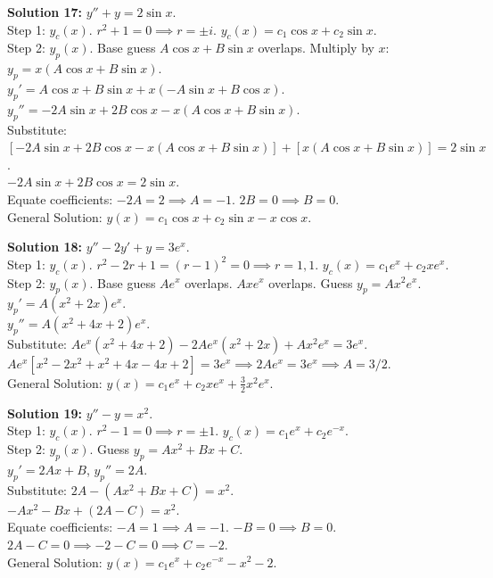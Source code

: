 \documentclass[11pt]{article}
\begin{document}
\textbf{Solution 17:} $y'' + y = 2 \sin x$. \\
Step 1: $y_c(x)$. $r^2 + 1 = 0 \implies r = \pm i$. $y_c(x) = c_1 \cos x + c_2 \sin x$. \\
Step 2: $y_p(x)$. Base guess $A \cos x + B \sin x$ overlaps. Multiply by $x$: $y_p = x(A \cos x + B \sin x)$. \\
$y_p' = A \cos x + B \sin x + x(-A \sin x + B \cos x)$. \\
$y_p'' = -2A \sin x + 2B \cos x - x(A \cos x + B \sin x)$. \\
Substitute: $[-2A \sin x + 2B \cos x - x(A \cos x + B \sin x)] + [x(A \cos x + B \sin x)] = 2 \sin x$. \\
$-2A \sin x + 2B \cos x = 2 \sin x$. \\
Equate coefficients: $-2A = 2 \implies A = -1$. $2B = 0 \implies B = 0$. \\
General Solution: $y(x) = c_1 \cos x + c_2 \sin x - x \cos x$.

\textbf{Solution 18:} $y'' - 2y' + y = 3e^x$. \\
Step 1: $y_c(x)$. $r^2 - 2r + 1 = (r-1)^2 = 0 \implies r=1, 1$. $y_c(x) = c_1 e^x + c_2 x e^x$. \\
Step 2: $y_p(x)$. Base guess $A e^x$ overlaps. $A x e^x$ overlaps. Guess $y_p = A x^2 e^x$. \\
$y_p' = A(x^2 + 2x)e^x$. \\
$y_p'' = A(x^2 + 4x + 2)e^x$. \\
Substitute: $A e^x (x^2 + 4x + 2) - 2A e^x (x^2 + 2x) + A x^2 e^x = 3e^x$. \\
$A e^x [x^2 - 2x^2 + x^2 + 4x - 4x + 2] = 3e^x \implies 2A e^x = 3e^x \implies A = 3/2$. \\
General Solution: $y(x) = c_1 e^x + c_2 x e^x + \frac{3}{2} x^2 e^x$.

\textbf{Solution 19:} $y'' - y = x^2$. \\
Step 1: $y_c(x)$. $r^2 - 1 = 0 \implies r = \pm 1$. $y_c(x) = c_1 e^x + c_2 e^{-x}$. \\
Step 2: $y_p(x)$. Guess $y_p = A x^2 + B x + C$. \\
$y_p' = 2Ax + B$, $y_p'' = 2A$. \\
Substitute: $2A - (A x^2 + B x + C) = x^2$. \\
$-A x^2 - B x + (2A - C) = x^2$. \\
Equate coefficients: $-A = 1 \implies A = -1$. $-B = 0 \implies B = 0$. $2A - C = 0 \implies -2 - C = 0 \implies C = -2$. \\
General Solution: $y(x) = c_1 e^x + c_2 e^{-x} - x^2 - 2$.
\end{document}
